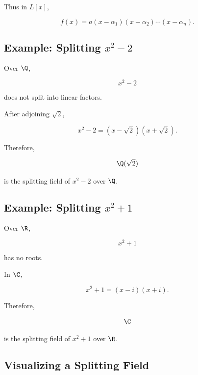 Thus in \(L[x]\),

\[ f(x)=a(x-\alpha_1)(x-\alpha_2)\cdots(x-\alpha_n). \]

\subsection{Example: Splitting \(x^2-2\)}
\label{subsec:splitting-x2-minus2}

Over \(\Q\),

\[ x^2-2 \]

does not split into linear factors.

After adjoining \(\sqrt2\),

\[ x^2-2=(x-\sqrt2)(x+\sqrt2). \]

Therefore,

\[ \Q(\sqrt2) \]

is the splitting field of \(x^2-2\) over \(\Q\).

\subsection{Example: Splitting \(x^2+1\)}
\label{subsec:splitting-x2-plus1}

Over \(\R\),

\[ x^2+1 \]

has no roots.

In \(\C\),

\[ x^2+1=(x-i)(x+i). \]

Therefore,

\[ \C \]

is the splitting field of \(x^2+1\) over \(\R\).

\subsection{Visualizing a Splitting Field}
\label{subsec:visual-splitting-field}

\begin{center}
\end{center}


